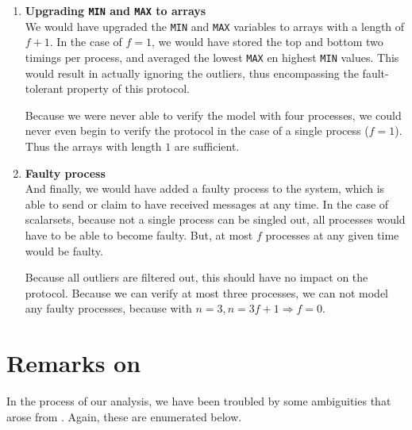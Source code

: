\documentclass[a4paper,10pt]{article}
\begin{document}
\begin{enumerate}
\item \textbf{Upgrading \texttt{MIN} and \texttt{MAX} to arrays} \\
	We would have upgraded the \texttt{MIN} and \texttt{MAX} variables to arrays with a length of $f+1$. In the case of $f=1$, we would have stored the top and bottom two timings per process, and averaged the lowest \texttt{MAX} en highest \texttt{MIN} values. This would result in actually ignoring the outliers, thus encompassing the fault-tolerant property of this protocol.
	
	Because we were never able to verify the model with four processes, we could never even begin to verify the protocol in the case of a single process ($f=1$). Thus the arrays with length $1$ are sufficient.
	
\item \textbf{Faulty process} \\
	And finally, we would have added a faulty process to the system, which is able to send or claim to have received messages at any time. In the case of scalarsets, because not a single process can be singled out, all processes would have to be able to become faulty. But, at most $f$ processes at any given time would be faulty.
	
	Because all outliers are filtered out, this should have no impact on the protocol. Because we can verify at most three processes, we can not model any faulty processes, because with $n = 3, n = 3f+1 \Rightarrow f=0$.
	
\end{enumerate}

\section{Remarks on \cite{Aceto2004Notes}\label{sec:remarks}}

In the process of our analysis, we have been troubled by some ambiguities that arose from \cite{Aceto2004Notes}. Again, these are enumerated below.
\end{document}
